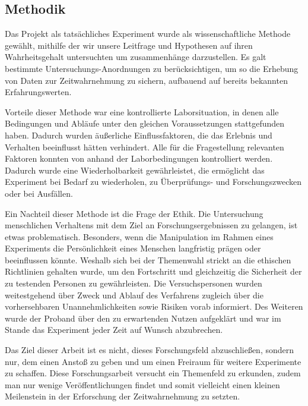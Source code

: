 \documentclass{Paper}
\begin{document}
	\subsection{Methodik}
	\par
		Das Projekt als tatsächliches Experiment wurde als wissenschaftliche Methode gewählt, mithilfe
		der wir unsere Leitfrage und Hypothesen auf ihren Wahrheitsgehalt untersuchten um
		zusammenhänge darzustellen. Es galt bestimmte Untersuchungs-Anordnungen zu
		berücksichtigen, um so die Erhebung von Daten zur Zeitwahrnehmung zu sichern, aufbauend
		auf bereits bekannten Erfahrungswerten.
		\par
		Vorteile dieser Methode war eine kontrollierte Laborsituation, in denen alle Bedingungen und
		Abläufe unter den gleichen Voraussetzungen stattgefunden haben. Dadurch wurden äußerliche
		Einflussfaktoren, die das Erlebnis und Verhalten beeinflusst hätten verhindert. Alle für die
		Fragestellung relevanten Faktoren konnten von anhand der Laborbedingungen kontrolliert werden.
		Dadurch wurde eine Wiederholbarkeit gewährleistet, die ermöglicht das Experiment bei Bedarf
		zu wiederholen, zu Überprüfungs- und Forschungszwecken oder bei Ausfällen.
		\par	
			Ein Nachteil dieser Methode ist die Frage der Ethik. Die Untersuchung menschlichen Verhaltens
		mit dem Ziel an Forschungsergebnissen zu gelangen, ist etwas problematisch. Besonders,
		wenn die Manipulation im Rahmen eines Experiments die Persönlichkeit eines Menschen
		langfristig prägen oder beeinflussen könnte. Weshalb sich bei der Themenwahl strickt an die
		ethischen Richtlinien gehalten wurde, um den Fortschritt und gleichzeitig die Sicherheit der zu
		testenden Personen zu gewährleisten. Die Versuchspersonen wurden weitestgehend über
		Zweck und Ablauf des Verfahrens zugleich über die vorhersehbaren Unannehmlichkeiten sowie
		Risiken vorab informiert. Des Weiteren wurde der Proband über den zu erwartenden Nutzen
		aufgeklärt und war im Stande das Experiment jeder Zeit auf Wunsch abzubrechen.
		\par	
Das Ziel dieser Arbeit ist es nicht, dieses Forschungsfeld abzuschließen, sondern nur, dem einen Anstoß zu geben und um einen Freiraum für weitere Experimente zu schaffen. Diese Forschungsarbeit versucht ein Themenfeld zu erkunden, zudem man nur wenige Veröffentlichungen findet und somit vielleicht einen kleinen Meilenstein in der Erforschung der Zeitwahrnehmung zu setzten.		
\end{document}
